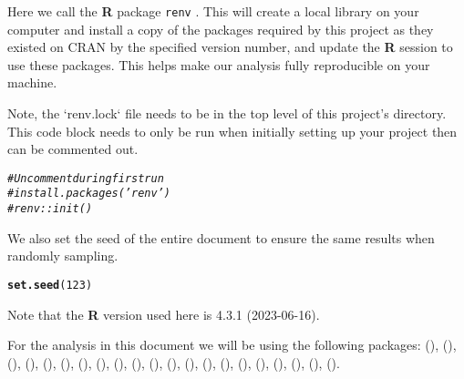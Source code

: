 \documentclass{article}\usepackage[]{graphicx}\usepackage[]{xcolor}
\makeatletter
\newcommand{\hlnum}[1]{\textcolor[rgb]{0.686,0.059,0.569}{#1}}%
\newcommand{\hlcom}[1]{\textcolor[rgb]{0.678,0.584,0.686}{\textit{#1}}}%
\newcommand{\hlstd}[1]{\textcolor[rgb]{0.345,0.345,0.345}{#1}}%
\newcommand{\hlkwd}[1]{\textcolor[rgb]{0.737,0.353,0.396}{\textbf{#1}}}%
\newenvironment{kframe}{%
 \def\at@end@of@kframe{}%
 \ifinner\ifhmode%
  \def\at@end@of@kframe{\end{minipage}}%
  \begin{minipage}{\columnwidth}%
 \fi\fi%
 \def\FrameCommand##1{\hskip\@totalleftmargin \hskip-\fboxsep
 \colorbox{shadecolor}{##1}\hskip-\fboxsep
     \hskip-\linewidth \hskip-\@totalleftmargin \hskip\columnwidth}%
 \MakeFramed {\advance\hsize-\width
   \@totalleftmargin\z@ \linewidth\hsize
   \@setminipage}}%
 {\par\unskip\endMakeFramed%
 \at@end@of@kframe}
\newenvironment{knitrout}{}{} %
\makeatother
\begin{document}
Here we call the  \textbf{R} package \texttt{renv} \cite{R-renv}. This will create a local library on your computer and install a copy of the packages required by this project as they existed on CRAN by the specified version number, and update the \textbf{R} session to use these packages. This helps make our analysis fully reproducible on your machine. 

Note, the `renv.lock` file needs to be in the top level of this project's directory. This code block needs to only be run when initially setting up your project then can be commented out.

\begin{knitrout}
\color{fgcolor}\begin{kframe}
\begin{alltt}
\hlcom{# Uncomment during first run}
\hlcom{# install.packages('renv')}
\hlcom{# renv::init()}
\end{alltt}
\end{kframe}
\end{knitrout}

We also set the seed of the entire document to ensure the same results when randomly sampling.

\begin{knitrout}
\color{fgcolor}\begin{kframe}
\begin{alltt}
\hlkwd{set.seed}\hlstd{(}\hlnum{123}\hlstd{)}
\end{alltt}
\end{kframe}
\end{knitrout}


Note that the \textbf{R} version used here is 4.3.1 (2023-06-16).






 
For the analysis in this document we will be using the following packages:  (\cite{R-data.table}),  (\cite{R-foreach}),  (\cite{R-formatR}),  (\cite{R-ggthemes}),  (\cite{R-gmodels}),  (\cite{R-hablar}),  (\cite{R-leaflet}),  (\cite{R-lintr}),  (\cite{R-magrittr}),  (\cite{R-knitr}),  (\cite{R-kknn}),  (\cite{R-plyr}),  (\cite{R-raster}),  (\cite{R-renv}),  (\cite{R-reshape2}),  (\cite{R-rgdal}),  (\cite{R-rworldmap}),  (\cite{R-sf}),  (\cite{R-tidyverse}),  (\cite{R-viridis}),  (\cite{R-zoo}).
\end{document}
